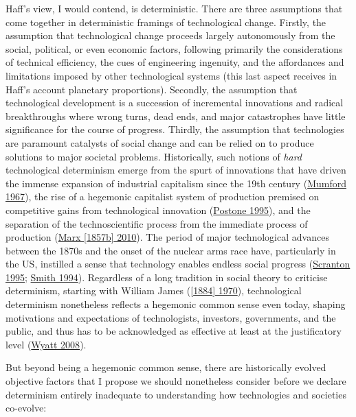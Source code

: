 \documentclass[a4paper, nobind]{templates/ociamthesis}
\begin{document}
Haff's view, I would contend, is deterministic. There are three assumptions that come together in deterministic framings of technological change. Firstly, the assumption that technological change proceeds largely autonomously from the social, political, or even economic factors, following primarily the considerations of technical efficiency, the cues of engineering ingenuity, and the affordances and limitations imposed by other technological systems (this last aspect receives in Haff's account planetary proportions). Secondly, the assumption that technological development is a succession of incremental innovations and radical breakthroughs where wrong turns, dead ends, and major catastrophes have little significance for the course of progress. Thirdly, the assumption that technologies are paramount catalysts of social change and can be relied on to produce solutions to major societal problems. Historically, such notions of \emph{hard} technological determinism emerge from the spurt of innovations that have driven the immense expansion of industrial capitalism since the 19th century (\protect\hyperlink{ref-mumford_myth_1967}{Mumford 1967}), the rise of a hegemonic capitalist system of production premised on competitive gains from technological innovation (\protect\hyperlink{ref-postone_time_1995}{Postone 1995}), and the separation of the technoscientific process from the immediate process of production (\protect\hyperlink{ref-marx_economic_1857}{Marx {[}1857b{]} 2010}). The period of major technological advances between the 1870s and the onset of the nuclear arms race have, particularly in the US, instilled a sense that technology enables endless social progress (\protect\hyperlink{ref-scranton_determinism_1995}{Scranton 1995}; \protect\hyperlink{ref-smith_technological_1994}{Smith 1994}). Regardless of a long tradition in social theory to criticise determinism, starting with William James (\protect\hyperlink{ref-james_dilemma_1884}{{[}1884{]} 1970}), technological determinism nonetheless reflects a hegemonic common sense even today, shaping motivations and expectations of technologists, investors, governments, and the public, and thus has to be acknowledged as effective at least at the justificatory level (\protect\hyperlink{ref-wyatt_technological_2008}{Wyatt 2008}).

But beyond being a hegemonic common sense, there are historically evolved objective factors that I propose we should nonetheless consider before we declare determinism entirely inadequate to understanding how technologies and societies co-evolve:
\end{document}
